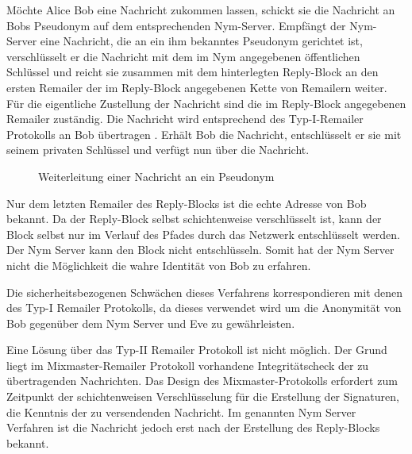 Möchte Alice Bob eine Nachricht zukommen lassen, schickt sie die Nachricht an Bobs Pseudonym auf dem entsprechenden Nym-Server. Empfängt der Nym-Server eine Nachricht, die an ein ihm bekanntes Pseudonym gerichtet ist, verschlüsselt er die Nachricht mit dem im Nym angegebenen öffentlichen Schlüssel und reicht sie zusammen mit dem hinterlegten Reply-Block an den ersten Remailer der im Reply-Block angegebenen Kette von Remailern weiter. Für die eigentliche Zustellung der Nachricht sind die im Reply-Block angegebenen Remailer zuständig. Die Nachricht wird entsprechend des Typ-I-Remailer Protokolls an Bob übertragen \cite[S. 26]{loesing2009privacy}. Erhält Bob die Nachricht, entschlüsselt er sie mit seinem privaten Schlüssel und verfügt nun über die Nachricht. 

\newpage

\begin{figure}
	\centering
	\begin{sequencediagram}
	\end{sequencediagram}
	\caption{Weiterleitung einer Nachricht an ein Pseudonym}
\end{figure}

Nur dem letzten Remailer des Reply-Blocks ist die echte Adresse von Bob bekannt. Da der Reply-Block selbst schichtenweise verschlüsselt ist, kann der Block selbst nur im Verlauf des Pfades durch das Netzwerk entschlüsselt werden. Der Nym Server kann den Block nicht entschlüsseln. Somit hat der Nym Server nicht die Möglichkeit die wahre Identität von Bob zu erfahren.

Die sicherheitsbezogenen Schwächen dieses Verfahrens korrespondieren mit denen des Typ-I Remailer Protokolls, da dieses verwendet wird um die Anonymität von Bob gegenüber dem Nym Server und Eve zu gewährleisten.

Eine Lösung über das Typ-II Remailer Protokoll ist nicht möglich. Der Grund liegt im Mixmaster-Remailer Protokoll vorhandene Integritätscheck der zu übertragenden Nachrichten. Das Design des Mixmaster-Protokolls erfordert zum Zeitpunkt der schichtenweisen Verschlüsselung für die Erstellung der Signaturen, die Kenntnis der zu versendenden Nachricht. Im genannten Nym Server Verfahren ist die Nachricht jedoch erst nach der Erstellung des Reply-Blocks bekannt.